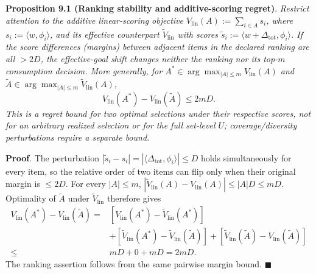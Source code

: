 \documentclass[
  11pt]{article}
\begin{document}
\textbf{Proposition 9.1 (Ranking stability and additive-scoring
regret)}. \emph{Restrict attention to the additive linear-scoring
objective \(V_{\mathrm{lin}}(A):=\sum_{i\in A}s_i\), where
\(s_i:=\langle w,\phi_i\rangle\), and its effective counterpart
\(\widetilde V_{\mathrm{lin}}\) with scores
\(\widetilde s_i:=\langle w+\Delta_{\mathrm{tot}},\phi_i\rangle\). If
the score differences (margins) between adjacent items in the declared
ranking are all \(>2D\), the effective-goal shift changes neither the
ranking nor its top-\(m\) consumption decision. More generally, for
\(A^*\in\arg\max_{|A|\le m}V_{\mathrm{lin}}(A)\) and
\(\widetilde A\in\arg\max_{|A|\le m}\widetilde V_{\mathrm{lin}}(A)\),}
\[V_{\mathrm{lin}}(A^*)-V_{\mathrm{lin}}(\widetilde A)\le 2mD.\]
\emph{This is a regret bound for two optimal selections under their
respective scores, not for an arbitrary realized selection or for the
full set-level \(U\); coverage/diversity perturbations require a
separate bound.}

\textbf{Proof}. The perturbation
\(|\widetilde s_i-s_i|=|\langle\Delta_{\mathrm{tot}},\phi_i\rangle|\le D\)
holds simultaneously for every item, so the relative order of two items
can flip only when their original margin is \(\le2D\). For every
\(|A|\le m\),
\(|\widetilde V_{\mathrm{lin}}(A)-V_{\mathrm{lin}}(A)|\le|A|D\le mD\).
Optimality of \(\widetilde A\) under \(\widetilde V_{\mathrm{lin}}\)
therefore gives \[\begin{aligned}
V_{\mathrm{lin}}(A^*)-V_{\mathrm{lin}}(\widetilde A)
={}&[V_{\mathrm{lin}}(A^*)-\widetilde V_{\mathrm{lin}}(A^*)]\\
&+[\widetilde V_{\mathrm{lin}}(A^*)-\widetilde V_{\mathrm{lin}}(\widetilde A)]
+[\widetilde V_{\mathrm{lin}}(\widetilde A)-V_{\mathrm{lin}}(\widetilde A)]\\
\le{}&mD+0+mD=2mD.
\end{aligned}\] The ranking assertion follows from the same pairwise
margin bound. \(\blacksquare\)
\end{document}
